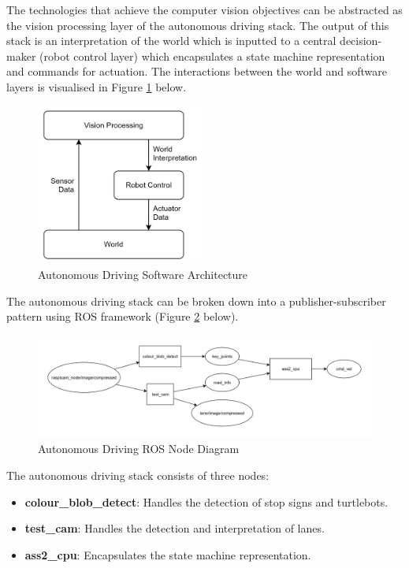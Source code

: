 \documentclass[11pt]{article}
\begin{document}
    The technologies that achieve the computer vision objectives can be abstracted as the vision processing layer of the autonomous driving stack. The output of this stack is an interpretation of the world which is inputted to a central decision-maker (robot control layer) which encapsulates a state machine representation and commands for actuation. The interactions between the world and software layers is visualised in Figure \ref{fig:stack_diagram} below.

    \begin{figure}[h!]
        \centering
        \includegraphics[width=55mm]{images/stack.png}
        \caption{Autonomous Driving Software Architecture}
        \label{fig:stack_diagram}
    \end{figure}

    The autonomous driving stack can be broken down into a publisher-subscriber pattern using ROS framework (Figure \ref{fig:ros_node_diagram} below).

    \begin{figure}[h!]
        \centering
        \includegraphics[width=\textwidth]{images/ros_node_diagram.png}
        \caption{Autonomous Driving ROS Node Diagram}
        \label{fig:ros_node_diagram}
    \end{figure}

    The autonomous driving stack consists of three nodes:
    \begin{itemize}[nolistsep, noitemsep]
        \item \textbf{colour\_blob\_detect}: Handles the detection of stop signs and turtlebots.
        \item \textbf{test\_cam}: Handles the detection and interpretation of lanes.
        \item \textbf{ass2\_cpu}: Encapsulates the state machine representation.
    \end{itemize}
\end{document}
